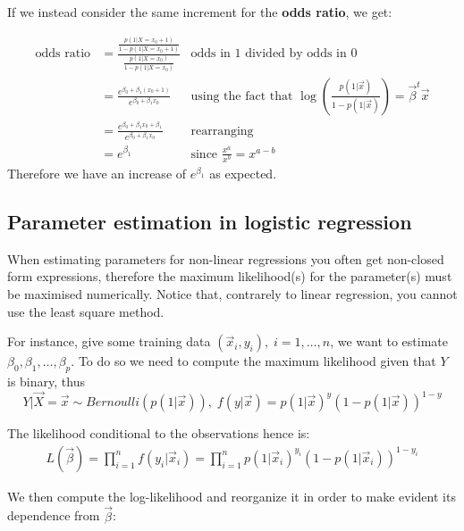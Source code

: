     If we instead consider the same increment for the \textbf{odds ratio}, we get:

    \begin{align*}
      \text{odds ratio}
      & = \frac{\frac{p(1|X=x_0+1)}{1-p(1|X=x_0+1)}}{\frac{p(1|X=x_0)}{1-p(1|X=x_0)}} 
      & \text{odds in 1 divided by odds in 0}\\
      & = \frac{e^{\beta_0 + \beta_1 (x_0 + 1)}}{e^{\beta_0 + \beta_1 x_0}}
      & \text{using the fact that } \log\left(\frac{p(1|\vec{x})}{1 - p(1|\vec{x})}\right)= \vec{\beta}^t\vec{x}\\
      & = \frac{e^{\beta_0 + \beta_1x_0 + \beta_1}}{e^{\beta_0 + \beta_1 x_0}} 
      & \text{rearranging}\\
      & = e^{\beta_1}
      & \text{since } \frac{x^a}{x^b} = x^{a-b}
    \end{align*}
    Therefore we have an increase of \textbf{$e^{\beta_1}$} as expected.

    \subsection{Parameter estimation in logistic regression}
    When estimating parameters for non-linear regressions you often get non-closed form expressions, therefore the maximum likelihood(s) for the parameter(s) must be maximised numerically. Notice that, contrarely to linear regression, you cannot use the least square method.

    For instance, give some training data $(\vec{x}_i, y_i), \; i=1, \dots, n$, we want to estimate $\beta_0, \beta_1, \dots, \beta_p$. To do so we need to compute the maximum likelihood given that $Y$ is binary, thus
    $$Y|\vec{X} = \vec{x} \sim Bernoulli(p(1|\vec{x})), \; f(y|\vec{x}) = p(1|\vec{x})^y(1-p(1|\vec{x}))^{1-y}$$
    
    The likelihood conditional to the observations hence is:
    \begin{align*}
    L(\vec{\beta}) = \prod_{i=1}^{n}f(y_i|\vec{x}_i) = \prod_{i=1}^{n}p(1|\vec{x}_i)^{y_i}(1-p(1|\vec{x}_i))^{1-y_i}
    \end{align*} %
    
    We then compute the log-likelihood and reorganize it in order to make evident its dependence from $\vec{\beta}$:
    
